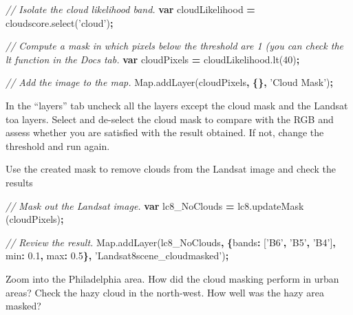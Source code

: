 \documentclass[]{article}
\newenvironment{Shaded}{\begin{snugshade}}{\end{snugshade}}
\newcommand{\AttributeTok}[1]{\textcolor[rgb]{0.77,0.63,0.00}{#1}}
\newcommand{\CommentTok}[1]{\textcolor[rgb]{0.56,0.35,0.01}{\textit{#1}}}
\newcommand{\DataTypeTok}[1]{\textcolor[rgb]{0.13,0.29,0.53}{#1}}
\newcommand{\DecValTok}[1]{\textcolor[rgb]{0.00,0.00,0.81}{#1}}
\newcommand{\FloatTok}[1]{\textcolor[rgb]{0.00,0.00,0.81}{#1}}
\newcommand{\KeywordTok}[1]{\textcolor[rgb]{0.13,0.29,0.53}{\textbf{#1}}}
\newcommand{\NormalTok}[1]{#1}
\newcommand{\OperatorTok}[1]{\textcolor[rgb]{0.81,0.36,0.00}{\textbf{#1}}}
\newcommand{\StringTok}[1]{\textcolor[rgb]{0.31,0.60,0.02}{#1}}
\newcommand{\VariableTok}[1]{\textcolor[rgb]{0.00,0.00,0.00}{#1}}
\begin{document}
\begin{Shaded}
\begin{Highlighting}[]
\CommentTok{// Isolate the cloud likelihood band.}
\KeywordTok{var}\NormalTok{ cloudLikelihood }\OperatorTok{=} \VariableTok{cloudscore}\NormalTok{.}\AttributeTok{select}\NormalTok{(}\StringTok{'cloud'}\NormalTok{)}\OperatorTok{;}

\CommentTok{// Compute a mask in which pixels below the threshold are 1 (you can check the lt function in the Docs tab.}
\KeywordTok{var}\NormalTok{ cloudPixels }\OperatorTok{=} \VariableTok{cloudLikelihood}\NormalTok{.}\AttributeTok{lt}\NormalTok{(}\DecValTok{40}\NormalTok{)}\OperatorTok{;}

\CommentTok{// Add the image to the map.}
\VariableTok{Map}\NormalTok{.}\AttributeTok{addLayer}\NormalTok{(cloudPixels}\OperatorTok{,} \OperatorTok{\{\},} \StringTok{'Cloud Mask'}\NormalTok{)}\OperatorTok{;}
\end{Highlighting}
\end{Shaded}

In the ``layers'' tab uncheck all the layers except the cloud mask and
the Landsat toa layers. Select and de-select the cloud mask to compare
with the RGB and assess whether you are satisfied with the result
obtained. If not, change the threshold and run again.

Use the created mask to remove clouds from the Landsat image and check
the results

\begin{Shaded}
\begin{Highlighting}[]
\CommentTok{// Mask out the Landsat image.}
\KeywordTok{var}\NormalTok{ lc8_NoClouds }\OperatorTok{=} \VariableTok{lc8}\NormalTok{.}\AttributeTok{updateMask}\NormalTok{ (cloudPixels)}\OperatorTok{;}

\CommentTok{// Review the result.}
\VariableTok{Map}\NormalTok{.}\AttributeTok{addLayer}\NormalTok{(lc8_NoClouds}\OperatorTok{,} \OperatorTok{\{}\DataTypeTok{bands}\OperatorTok{:}\NormalTok{ [}\StringTok{'B6'}\OperatorTok{,} \StringTok{'B5'}\OperatorTok{,} \StringTok{'B4'}\NormalTok{]}\OperatorTok{,} \DataTypeTok{min}\OperatorTok{:} \FloatTok{0.1}\OperatorTok{,} \DataTypeTok{max}\OperatorTok{:} \FloatTok{0.5}\OperatorTok{\},} \StringTok{'Landsat8scene_cloudmasked'}\NormalTok{)}\OperatorTok{;}
\end{Highlighting}
\end{Shaded}

Zoom into the Philadelphia area. How did the cloud masking perform in
urban areas? Check the hazy cloud in the north-west. How well was the
hazy area masked?
\end{document}
